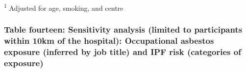 \documentclass[
]{article}
\begin{document}
\textsuperscript{1} Adjusted for age, smoking, and centre

\hypertarget{table-fourteen-sensitivity-analysis-limited-to-participants-within-10km-of-the-hospital-occupational-asbestos-exposure-inferred-by-job-title-and-ipf-risk-categories-of-exposure}{%
\subsubsection{Table fourteen: Sensitivity analysis (limited to
participants within 10km of the hospital): Occupational asbestos
exposure (inferred by job title) and IPF risk (categories of
exposure)}\label{table-fourteen-sensitivity-analysis-limited-to-participants-within-10km-of-the-hospital-occupational-asbestos-exposure-inferred-by-job-title-and-ipf-risk-categories-of-exposure}}
\end{document}
